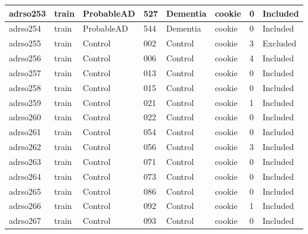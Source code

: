 \begin{center}
\begin{longtable}{|l|l|l|l|l|l|l|l|}
adrso253  & train            & ProbableAD   & 527         & Dementia             & cookie          & 0                & Included      \\ \hline
adrso254  & train            & ProbableAD   & 544         & Dementia             & cookie          & 0                & Included      \\ \hline
adrso255  & train            & Control      & 002         & Control              & cookie          & 3                & Excluded      \\ \hline
adrso256  & train            & Control      & 006         & Control              & cookie          & 4                & Included      \\ \hline
adrso257  & train            & Control      & 013         & Control              & cookie          & 0                & Included      \\ \hline
adrso258  & train            & Control      & 015         & Control              & cookie          & 0                & Included      \\ \hline
adrso259  & train            & Control      & 021         & Control              & cookie          & 1                & Included      \\ \hline
adrso260  & train            & Control      & 022         & Control              & cookie          & 0                & Included      \\ \hline
adrso261  & train            & Control      & 054         & Control              & cookie          & 0                & Included      \\ \hline
adrso262  & train            & Control      & 056         & Control              & cookie          & 3                & Included      \\ \hline
adrso263  & train            & Control      & 071         & Control              & cookie          & 0                & Included      \\ \hline
adrso264  & train            & Control      & 073         & Control              & cookie          & 0                & Included      \\ \hline
adrso265  & train            & Control      & 086         & Control              & cookie          & 0                & Included      \\ \hline
adrso266  & train            & Control      & 092         & Control              & cookie          & 1                & Included      \\ \hline
adrso267  & train            & Control      & 093         & Control              & cookie          & 0                & Included      \\ \hline

\end{longtable}
\end{center}
